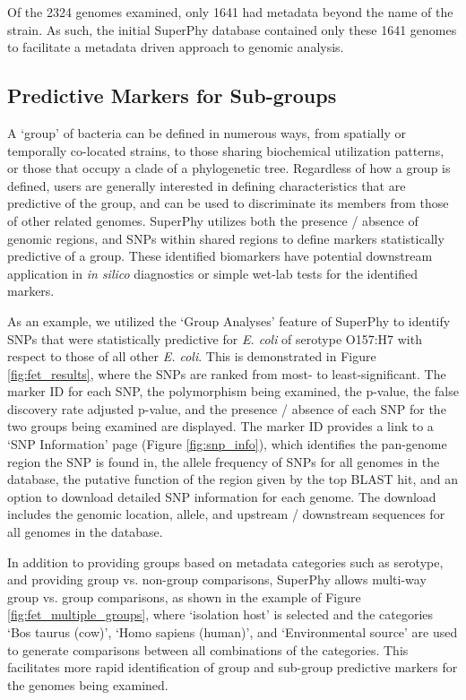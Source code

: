\documentclass[doublespacing, linenumbers]{bmcart}
\begin{document}
Of the 2324 genomes examined, only 1641 had metadata beyond the name of the strain. As such, the initial SuperPhy database contained only these 1641 genomes to facilitate a metadata driven approach to genomic analysis.

\subsection{Predictive Markers for Sub-groups}
A `group' of bacteria can be defined in numerous ways, from spatially or temporally co-located strains, to those sharing biochemical utilization patterns, or those that occupy a clade of a phylogenetic tree. Regardless of how a group is defined, users are generally interested in defining characteristics that are predictive of the group, and can be used to discriminate its members from those of other related genomes. SuperPhy utilizes both the presence / absence of genomic regions, and SNPs within shared regions to define markers statistically predictive of a group. These identified biomarkers have potential downstream application in \textit{in silico} diagnostics or simple wet-lab tests for the identified markers.

As an example, we utilized the `Group Analyses' feature of SuperPhy to identify SNPs that were statistically predictive for \textit{E. coli} of serotype O157:H7 with respect to those of all other \textit{E. coli}. This is demonstrated in Figure \ref{fig:fet_results}, where the SNPs are ranked from most- to least-significant. The marker ID for each SNP, the polymorphism being examined, the p-value, the false discovery rate adjusted p-value, and the presence / absence of each SNP for the two groups being examined are displayed. The marker ID provides a link to a `SNP Information' page (Figure \ref{fig:snp_info}), which identifies the pan-genome region the SNP is found in, the allele frequency of SNPs for all genomes in the database, the putative function of the region given by the top BLAST hit, and an option to download detailed SNP information for each genome. The download includes the genomic location, allele, and upstream / downstream sequences for all genomes in the database. 

In addition to providing groups based on metadata categories such as serotype, and providing group vs. non-group comparisons, SuperPhy allows multi-way group vs. group comparisons, as shown in the example of Figure \ref{fig:fet_multiple_groups}, where `isolation host' is selected and the categories `Bos taurus (cow)', `Homo sapiens (human)', and `Environmental source' are used to generate comparisons between all combinations of the categories. This facilitates more rapid identification of group and sub-group predictive markers for the genomes being examined.
\end{document}

